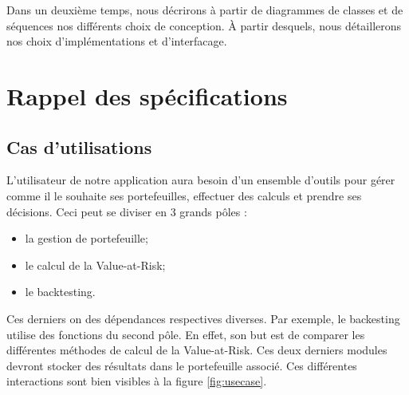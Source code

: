 \documentclass[a4paper]{report}
\begin{document}
Dans un deuxième temps, nous décrirons à partir de diagrammes de classes et de séquences nos différents choix de conception.
\`A partir desquels, nous détaillerons nos choix d'implémentations et d'interfacage.


\chapter{Rappel des spécifications}

\section{Cas d'utilisations}

L'utilisateur de notre application aura besoin d'un ensemble d'outils pour gérer comme il le souhaite ses portefeuilles, effectuer des calculs et prendre ses décisions. Ceci peut se diviser en 3 grands pôles :
\begin{itemize}
\item la gestion de portefeuille;
\item le calcul de la Value-at-Risk;
\item le backtesting.
\end{itemize}
 
Ces derniers on des dépendances respectives diverses. Par exemple, le backesting utilise des fonctions du second pôle.
En effet, son but est de comparer les différentes méthodes de calcul de la Value-at-Risk.
Ces deux derniers modules devront stocker des résultats dans le portefeuille associé.
Ces différentes interactions sont bien visibles à la figure \ref{fig:usecase}.
\end{document}
